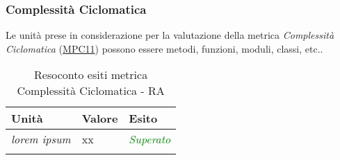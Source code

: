 \subsubsection{Complessità Ciclomatica}
Le unità prese in considerazione per la valutazione della metrica \textit{Complessità Ciclomatica} (\hyperlink{MPC11}{MPC11}) possono essere metodi, funzioni, moduli, classi, etc..

\begin{longtable}{|>{\centering\arraybackslash}p{5cm}|>{\centering\arraybackslash}p{3cm}|>{\centering\arraybackslash}p{3cm}|}
	\hline
	\rowcolor{Gray}
	\textbf{Unità} & \textbf{Valore} & \textbf{Esito} \\
	\hline

	\textit{lorem ipsum} & xx & \textcolor{Green}{\textit{Superato}}\\
	\hline

	\caption{Resoconto esiti metrica Complessità Ciclomatica - RA}
\end{longtable}